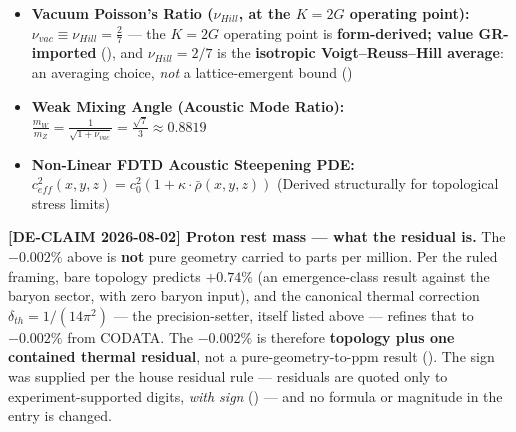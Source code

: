 \begin{itemize}
    \item \textbf{Vacuum Poisson's Ratio ($\nu_{Hill}$, at the $K = 2G$ operating point):} $\nu_{vac} \equiv \nu_{Hill} = \frac{2}{7}$ --- the $K = 2G$ operating point is \textbf{form-derived; value GR-imported} (), and $\nu_{Hill} = 2/7$ is the \textbf{isotropic Voigt--Reuss--Hill average}: an averaging choice, \emph{not} a lattice-emergent bound ()
    \item \textbf{Weak Mixing Angle (Acoustic Mode Ratio):} $\frac{m_W}{m_Z} = \frac{1}{\sqrt{1+\nu_{vac}}} = \frac{\sqrt{7}}{3} \approx \mathbf{0.8819}$
    \item \textbf{Non-Linear FDTD Acoustic Steepening PDE:} $c_{eff}^2(x, y, z) = c_0^2 \left(1 + \kappa \cdot \bar{\rho}(x, y, z) \right)$ (Derived structurally for topological stress limits)
\end{itemize}

\noindent\textbf{[DE-CLAIM 2026-08-02] Proton rest mass --- what the residual is.} The $-0.002\%$ above is \textbf{not} pure geometry carried to parts per million. Per the ruled framing, bare topology predicts $+0.74\%$ (an emergence-class result against the baryon sector, with zero baryon input), and the canonical thermal correction $\delta_{th} = 1/(14\pi^2)$ --- the precision-setter, itself listed above --- refines that to $-0.002\%$ from CODATA. The $-0.002\%$ is therefore \textbf{topology plus one contained thermal residual}, not a pure-geometry-to-ppm result (). The sign was supplied per the house residual rule --- residuals are quoted only to experiment-supported digits, \emph{with sign} () --- and no formula or magnitude in the entry is changed.

